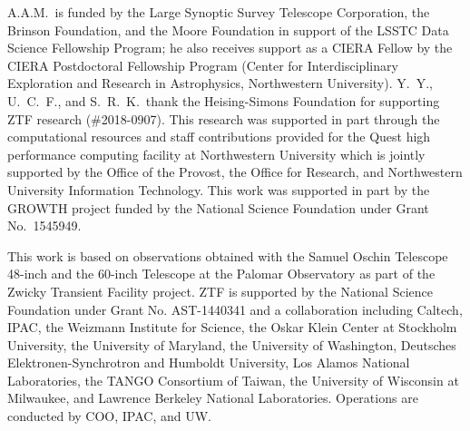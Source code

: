 \documentclass[twocolumn]{./aastex63}
\begin{document}
A.A.M.~is funded by the Large Synoptic Survey Telescope Corporation, the
Brinson Foundation, and the Moore Foundation in support of the LSSTC Data
Science Fellowship Program; he also receives support as a CIERA Fellow by the
CIERA Postdoctoral Fellowship Program (Center for Interdisciplinary
Exploration and Research in Astrophysics, Northwestern University). Y.~Y.,
U.~C.~F., and S.~R.~K.~thank the Heising-Simons Foundation for supporting ZTF
research (\#2018-0907). This research was supported in part through the
computational resources and staff contributions provided for the Quest high
performance computing facility at Northwestern University which is jointly
supported by the Office of the Provost, the Office for Research, and
Northwestern University Information Technology. This work was supported in
part by the GROWTH project funded by the National Science Foundation under
Grant No.~1545949.

This work is based on observations obtained with the Samuel Oschin Telescope
48-inch and the 60-inch Telescope at the Palomar Observatory as part of the
Zwicky Transient Facility project. ZTF is supported by the National Science
Foundation under Grant No. AST-1440341 and a collaboration including Caltech,
IPAC, the Weizmann Institute for Science, the Oskar Klein Center at Stockholm
University, the University of Maryland, the University of Washington,
Deutsches Elektronen-Synchrotron and Humboldt University, Los Alamos National
Laboratories, the TANGO Consortium of Taiwan, the University of Wisconsin at
Milwaukee, and Lawrence Berkeley National Laboratories. Operations are
conducted by COO, IPAC, and UW.



\appendix
\end{document}
